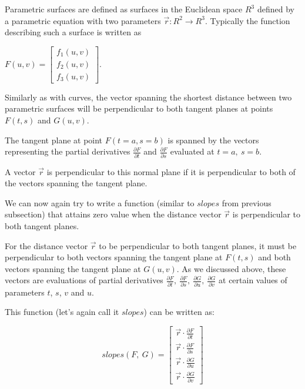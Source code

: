 \documentclass[A4]{article}
\begin{document}
Parametric surfaces are defined as surfaces in the Euclidean space $R^3$ defined by a parametric equation with two parameters $\vec{r}:R^2 \rightarrow R^3$. Typically the function describing such a surface is written as
 
$F(u, v) = \begin{bmatrix} f_{1}(u, v) \\ f_{2}(u, v) \\ f_{3}(u, v) \end{bmatrix}$.

Similarly as with curves, the vector spanning the shortest distance between two parametric surfaces will be perpendicular to both tangent planes at points $F(t, s)$ and $G(u, v)$.

The tangent plane at point $F(t = a, s = b)$ is spanned by the vectors representing the partial derivatives $\frac{\partial F}{\partial t}$ and $\frac{\partial F}{\partial s}$ evaluated at $t = a, \ s = b$.

A vector $\vec{r}$ is perpendicular to this normal plane if it is perpendicular to both of the vectors spanning the tangent plane.

We can now again try to write a function (similar to $slopes$ from previous subsection) that attains zero value when the distance vector $\vec{r}$ is perpendicular to both tangent planes.

For the distance vector $\vec{r}$ to be perpendicular to both tangent planes, it must be perpendicular to both vectors spanning the tangent plane at $F(t, s)$ and both vectors spanning the tangent plane at $G(u, v)$. As we discussed above, these vectors are evaluations of partial derivatives $\frac{\partial F}{\partial t}, \ \frac{\partial F}{\partial s}, \ \frac{\partial G}{\partial u}, \ \frac{\partial G}{\partial v}$ at certain values of parameters $t$, $s$, $v$ and $u$.

This function (let's again call it $slopes$) can be written as:

\begin{equation}
slopes(F, \ G) = \begin{bmatrix} \vec{r} \cdot \frac{\partial F}{ \partial t} \\ 
 \vec{r} \cdot \frac{\partial F}{ \partial s} \\
\vec{r} \cdot \frac{\partial G}{ \partial u} \\
\vec{r} \cdot \frac{\partial G}{ \partial v} \end{bmatrix}
\end{equation}
 
\end{document}
